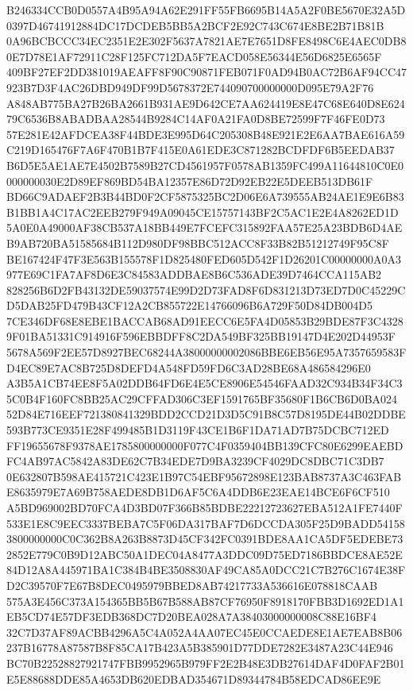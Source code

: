 \documentclass[UTF8,fontset=fandol,zihao=-4,a4paper]{ctexart}
\begin{document}
{{B246334CCB0D0557A4B95A94A62E291FF55FB6695B14A5A2F0BE5670E32A5D0397D46741912884DC17DCDEB5BB5A2BCF2E92C743C674E8BE2B71B81B
0A96BCBCCC34EC2351E2E302F5637A7821AE7E7651D8FE8498C6E4AEC0DB80E7D78E1AF72911C28F125FC712DA5F7EACD058E56344E56D6825E6565F
409BF27EF2DD381019AEAFF8F90C90871FEB071F0AD94B0AC72B6AF94CC47923B7D3F4AC26DBD949DF99D5678372E744090700000000D095E79A2F76
A848AB775BA27B26BA2661B931AE9D642CE7AA624419E8E47C68E640D8E62479C6536B8ABADBAA28544B9284C14AF0A21FA0D8BE72599F7F46FE0D73
57E281E42AFDCEA38F44BDE3E995D64C205308B48E921E2E6AA7BAE616A59C219D165476F7A6F470B1B7F415E0A61EDE3C871282BCDFDF6B5EEDAB37
B6D5E5AE1AE7E4502B7589B27CD4561957F0578AB1359FC499A11644810C0E0000000030E2D89EF869BD54BA12357E86D72D92EB22E5DEEB513DB61F
BD66C9ADAEF2B3B44BD0F2CF5875325BC2D06E6A739555AB24AE1E9E6B83B1BB1A4C17AC2EEB279F949A09045CE15757143BF2C5AC1E2E4A8262ED1D
5A0E0A49000AF38CB537A18BB449E7FCEFC315892FAA57E25A23BDB6D4AEB9AB720BA51585684B112D980DF98BBC512ACC8F33B82B51212749F95C8F
BE167424F47F3E563B155578F1D825480FED605D542F1D26201C00000000A0A3977E69C1FA7AF8D6E3C84583ADDBAE8B6C536ADE39D7464CCA115AB2
828256B6D2FB43132DE59037574E99D2D73FAD8F6D831213D73ED7D0C45229CD5DAB25FD479B43CF12A2CB855722E14766096B6A729F50D84DB004D5
7CE346DF68E8EBE1BACCAB68AD91EECC6E5FA4D05853B29BDE87F3C43289F01BA51331C914916F596EBBDFF8C2DA549BF325BB19147D4E202D44953F
5678A569F2EE57D8927BEC68244A38000000002086BBE6EB56E95A7357659583FD4EC89E7AC8B725D8DEFD4A548FD59FD6C3AD28BE68A486584296E0
A3B5A1CB74EE8F5A02DDB64FD6E4E5CE8906E54546FAAD32C934B34F34C35C0B4F160FC8BB25AC29CFFAD306C3EF1591765BF35680F1B6CB6D0BA024
52D84E716EEF721380841329BDD2CCD21D3D5C91B8C57D8195DE44B02DDBE593B773CE9351E28F499485B1D3119F43CE1B6F1DA71AD7B75DCBC712ED
FF19655678F9378AE1785800000000F077C4F0359404BB139CFC80E6299EAEBDFC4AB97AC5842A83DE62C7B34EDE7D9BA3239CF4029DC8DBC71C3DB7
0E632807B598AE415721C423E1B97C54EBF95672898E123BAB8737A3C463FABE8635979E7A69B758AEDE8DB1D6AF5C6A4DDB6E23EAE14BCE6F6CF510
A5BD969002BD70FCA4D3BD07F366B85BDBE22212723627EBA512A1FE7440F533E1E8C9EEC3337BEBA7C5F06DA317BAF7D6DCCDA305F25D9BADD54158
3800000000C0C362B8A263B8873D45CF342FC0391BDE8AA1CA5DF5EDEBE732852E779C0B9D12ABC50A1DEC04A8477A3DDC09D75ED7186BBDCE8AE52E
84D12A8A445971BA1C384B4BE3508830AF49CA85A0DCC21C7B276C1674E38FD2C39570F7E67B8DEC0495979BBED8AB74217733A536616E078818CAAB
575A3E456C373A154365BB5B67B588AB87CF76950F8918170FBB3D1692ED1A1EB5CD74E57DF3EDB368DC7D20BEA028A7A38403000000008C88E16BF4
32C7D37AF89ACBB4296A5C4A052A4AA07EC45E0CCAEDE8E1AE7EAB8B06237B16778A87587B8F85CA17B423A5B385901D77DDE7282E3487A23C44E946
BC70B22528827921747FBB9952965B979FF2E2B48E3DB27614DAF4D0FAF2B01E5E88688DDE85A4653DB620EDBAD354671D89344784B58EDCAD86EE9E
}}
\end{document}

